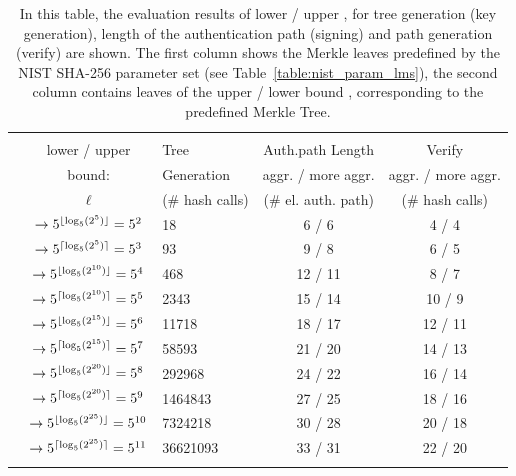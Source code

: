 \begin{table}
\centering
\begin{tabular}{r c l c c} 
 \hline\noalign{\smallskip}
 \multicolumn{5}{c}{\textbf{Evaluation Results: Lower / Upper Bound \tftree\xspace/\xspace\extree}} \\
 \noalign{\smallskip} 
 & lower / upper  & Tree & Auth.path Length & Verify \\
 \noalign{\smallskip}
 & bound: & Generation & aggr. / more aggr. & aggr. / more aggr.\\
 \noalign{\smallskip}
  & $\ell$  & (\# hash calls) & (\# el. auth. path) & (\# hash calls) \\
 \hline\noalign{\smallskip}
 \multirow{2}{*}{$2^5$} & $\rightarrow 5^{\lfloor\log_5(2^5)\rfloor} = 5^{2} $ & 18 & 6 / 6 & 4 / 4 \\
 & $\rightarrow 5^{\lceil\log_5(2^5)\rceil} = 5^{3}$ & 93 & 9 / 8 & 6 / 5 \\
 \hline\noalign{\smallskip} 
 \multirow{2}{*}{$2^{10}$} & $\rightarrow 5^{\lfloor\log_5(2^{10})\rfloor} = 5^{4}$ & 468 & 12 / 11 & 8 / 7 \\
 & $\rightarrow 5^{\lceil\log_5(2^{10})\rceil} = 5^{5}$ & 2343 & 15 / 14 & 10 / 9 \\
 \hline\noalign{\smallskip} 
 \multirow{2}{*}{$2^{15}$}& $\rightarrow 5^{\lfloor\log_5(2^{15})\rfloor} = 5^{6}$ & 11718 & 18 / 17 & 12 / 11 \\ 
 & $\rightarrow 5^{\lceil\log_5(2^{15})\rceil} = 5^{7}$ & 58593 & 21 / 20 & 14 / 13 \\ 
 \hline\noalign{\smallskip} 
 \multirow{2}{*}{$2^{20}$} & $\rightarrow 5^{\lfloor\log_5(2^{20})\rfloor} = 5^{8}$ & 292968 & 24 / 22 & 16 / 14 \\ 
 & $\rightarrow 5^{\lceil\log_5(2^{20})\rceil} = 5^{9}$ & 1464843 & 27 / 25 & 18 / 16 \\
 \hline\noalign{\smallskip}  
  \multirow{2}{*}{$2^{25}$} & $\rightarrow 5^{\lfloor\log_5(2^{25})\rfloor} =  5^{10}$ & 7324218 & 30 / 28 & 20 / 18 \\ 
 & $\rightarrow 5^{\lceil\log_5(2^{25})\rceil} = 5^{11}$ & 36621093 & 33 / 31 & 22 / 20 \\
 \hline\noalign{\smallskip}
 \end{tabular}
\caption{In this table, the evaluation results of lower / upper \tftree, \extree for tree generation (key generation), length of the authentication path (signing) and path generation (verify) are shown.
The first column shows the Merkle leaves predefined by the NIST SHA-256 parameter set (see Table~\ref{table:nist_param_lms}), the second column contains leaves of the upper / lower bound \tftree, \extree corresponding to the predefined Merkle Tree.}
\label{table:nist_upper_lower_bound}
\end{table}

